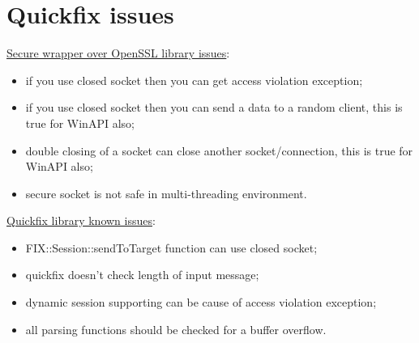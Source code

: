 \section{Quickfix issues}

\underline{Secure wrapper over OpenSSL library issues}:
\begin{itemize}[noitemsep, nolistsep]
  \item if you use closed socket then you can get access violation exception;
  \item if you use closed socket then you can send a data to a random client, this is true for WinAPI also;
  \item double closing of a socket can close another socket/connection, this is true for WinAPI also;
  \item secure socket is not safe in multi-threading environment.
\end{itemize}

\underline{Quickfix library known issues}:

\begin{itemize}[noitemsep, nolistsep]
  \item FIX::Session::sendToTarget function can use closed socket;
  \item quickfix doesn't check length of input message;
  \item dynamic session supporting can be cause of access violation exception;
  \item all parsing functions should be checked for a buffer overflow.
\end{itemize}
